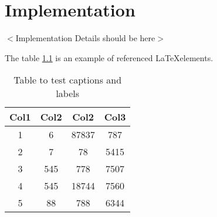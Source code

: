\chapter{Implementation}
$<$Implementation Details should be here$>$\newline

The table \ref{table:1} is an example of referenced \LaTeX elements.

\begin{table}[h!]
\centering
 \begin{tabular}{||c c c c||} 
 \hline
 Col1 & Col2 & Col2 & Col3 \\ [0.5ex] 
 \hline\hline
 1 & 6 & 87837 & 787 \\ 
 2 & 7 & 78 & 5415 \\
 3 & 545 & 778 & 7507 \\
 4 & 545 & 18744 & 7560 \\
 5 & 88 & 788 & 6344 \\ [1ex] 
 \hline
 \end{tabular}
 \caption{Table to test captions and labels}
 \label{table:1}
\end{table}